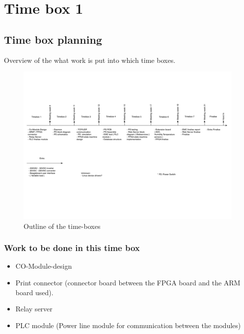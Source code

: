 \section{Time box 1}
\subsection{Time box planning}
Overview of the what work is put into which time boxes.
\begin{figure}[H]
	\begin{centering}
		 \includegraphics[width=1.0\textwidth]{content/appendix/eudp/images/tb_r1.pdf}
		\caption{Outline of the time-boxes}
	\end{centering}
\end{figure}

\subsubsection{Work to be done in this time box}
\begin{itemize}
	\item CO-Module-design
	\item Print connector (connector board between the FPGA board and the ARM board used).
	\item Relay server
	\item PLC module (Power line module for communication between the modules)
\end{itemize}

